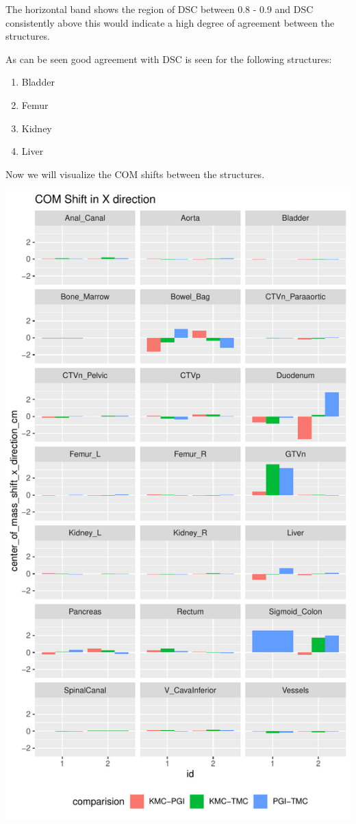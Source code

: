 \documentclass[
  letterpaper,
  DIV=11,
  numbers=noendperiod]{scrartcl}
\providecommand{\tightlist}{%
  \setlength{\itemsep}{0pt}\setlength{\parskip}{0pt}}\usepackage{longtable,booktabs,array}
\begin{document}
The horizontal band shows the region of DSC between 0.8 - 0.9 and DSC
consistently above this would indicate a high degree of agreement
between the structures.

As can be seen good agreement with DSC is seen for the following
structures:

\begin{enumerate}
\def\labelenumi{\arabic{enumi}.}
\tightlist
\item
  Bladder
\item
  Femur
\item
  Kidney
\item
  Liver
\end{enumerate}

Now we will visualize the COM shifts between the structures.

\includegraphics{analysis_files/figure-pdf/unnamed-chunk-8-1.pdf}
\end{document}
